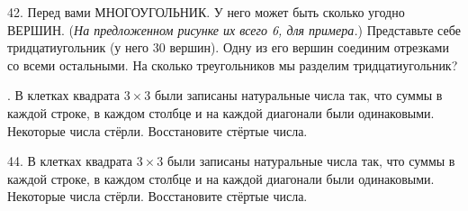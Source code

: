 \documentclass[12pt]{article}
\begin{document}
42. Перед вами МНОГОУГОЛЬНИК. У него может быть сколько угодно ВЕРШИН. ({\it На предложенном рисунке их всего 6, для примера.}) Представьте себе тридцатиугольник (у него 30 вершин). Одну из его вершин соединим отрезками со всеми остальными. На сколько треугольников мы разделим тридцатиугольник?
\begin{center}
\begin{figure}[ht!]
\end{figure}
\end{center}
\newpage
{}. В клетках квадрата $3\times3$ были записаны натуральные числа так, что суммы в каждой строке, в каждом столбце и на каждой диагонали были одинаковыми. Некоторые числа стёрли. Восстановите стёртые числа.
\begin{center}
\begin{figure}[ht!]
\end{figure}
\end{center}
44. В клетках квадрата $3\times3$ были записаны натуральные числа так, что суммы в каждой строке, в каждом столбце и на каждой диагонали были одинаковыми. Некоторые числа стёрли. Восстановите стёртые числа.
\begin{center}
\begin{figure}[ht!]
\end{figure}
\end{center}
\end{document}
